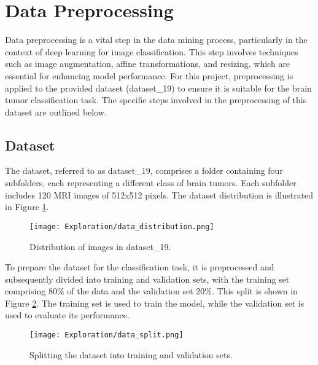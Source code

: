 \section{Data Preprocessing}\label{data_preprocessing}

Data preprocessing is a vital step in the data mining process, particularly in the context of deep learning for image classification. This step involves techniques such as image augmentation, affine transformations, and resizing, which are essential for enhancing model performance. For this project, preprocessing is applied to the provided dataset (dataset\_19) to ensure it is suitable for the brain tumor classification task. The specific steps involved in the preprocessing of this dataset are outlined below.

\subsection{Dataset}\label{dataset_given}

The dataset, referred to as dataset\_19, comprises a folder containing four subfolders, each representing a different class of brain tumors. Each subfolder includes 120 MRI images of 512x512 pixels. The dataset distribution is illustrated in Figure \ref{fig:data_distribution}.

\begin{figure}[H]
  \begin{center}
    \texttt{[image: Exploration/data\_distribution.png]}
  \end{center}
  \caption{Distribution of images in dataset\_19.}\label{fig:data_distribution}
\end{figure}

To prepare the dataset for the classification task, it is preprocessed and subsequently divided into training and validation sets, with the training set comprising 80\% of the data and the validation set 20\%. This split is shown in Figure \ref{fig:data_split}. The training set is used to train the model, while the validation set is used to evaluate its performance.

\begin{figure}[H]
  \begin{center}
    \texttt{[image: Exploration/data\_split.png]}
  \end{center}
  \caption{Splitting the dataset into training and validation sets.}\label{fig:data_split}
\end{figure}

